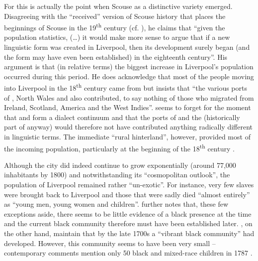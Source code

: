 For \citet[28]{crowley2012} this is actually the point when Scouse as a distinctive variety emerged.
Disagreeing with the ``received'' version of Scouse history that places the beginnings of Scouse in the 19\textsuperscript{th} century (cf. ), he claims that ``given the population statistics, (\dots) it would make more sense to argue that if a new linguistic form was created in Liverpool, then its development surely began (and the form may have even been established) in the eighteenth century''.
His argument is that (in relative terms) the biggest increase in Liverpool's population occurred during this period.
He does acknowledge that most of the people moving into Liverpool in the 18\textsuperscript{th} century came from  but insists that ``the various ports of , North Wales and  also contributed, to say nothing of those who migrated from Ireland, Scotland, America and the West Indies''.
\citeauthor{crowley2012} seems to forget for the moment that  and  form a dialect continuum and that the ports of  and the  (historically part of  anyway) would therefore not have contributed anything radically different in linguistic terms.
The immediate ``rural hinterland'', however, provided most of the incoming population, particularly at the beginning of the 18\textsuperscript{th} century \parencite[cf.][119]{longmore2006}.

Although the city did indeed continue to grow exponentially (around 77,000 inhabitants by 1800) and notwithstanding its ``cosmopolitan outlook'', the population of Liverpool remained rather ``un-exotic''.
For instance, very few slaves were brought back to Liverpool and those that were sadly died ``almost entirely'' as ``young men, young women and children''.
\textcite[cf.][161 and 169]{longmore2006} further notes that, these few exceptions aside, there seems to be little evidence of a black presence at the time and the current black community therefore must have been established later. \textcite{belchemmacraild2006}, on the other hand, maintain that by the late 1700s a ``vibrant black community'' had developed. However, this community seems to have been very small -- contemporary comments mention only 50 black and mixed-race children in 1787 \parencite[324]{belchemmacraild2006}.

